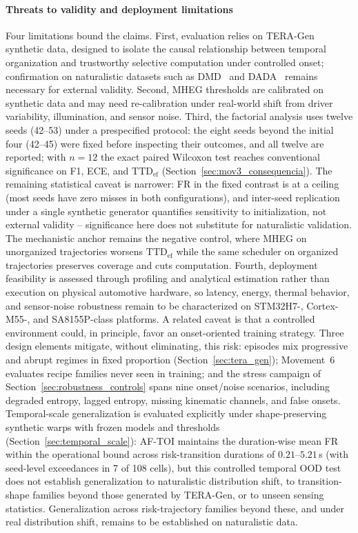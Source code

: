 \documentclass[a4paper,fleqn]{cas-dc}
\newcommand{\TERAGen}{\mbox{TERA-Gen}\xspace}
\newcommand{\MHEG}{\mbox{MHEG}\xspace}
\begin{document}
\paragraph{Threats to validity and deployment limitations}
\label{sec:limitations}
Four limitations bound the claims. First, evaluation relies on \TERAGen
synthetic data, designed to isolate the causal relationship between temporal
organization and trustworthy selective computation under controlled onset;
confirmation on naturalistic datasets such as DMD~\cite{ortega2020dmd} and
DADA~\cite{fang2022dada} remains necessary for external validity. Second, \MHEG
thresholds are calibrated on synthetic data and may need re-calibration under
real-world shift from driver variability, illumination, and sensor noise.
{\color{\revcolor}Third, the factorial analysis uses twelve seeds (42--53)
under a prespecified protocol: the eight seeds beyond the initial four
(42--45) were fixed before inspecting their outcomes, and all twelve
are reported; with $n=12$ the exact paired
Wilcoxon test reaches conventional significance on F1, ECE, and
$\mathrm{TTD}_{\mathrm{ef}}$ (Section~\ref{sec:mov3_consequencia}). The
remaining statistical caveat is narrower: FR in the fixed contrast is at a
ceiling (most seeds have zero misses in both configurations), and inter-seed
replication under a single synthetic generator quantifies sensitivity to
initialization, not external validity -- significance here does not substitute
for naturalistic validation. The mechanistic anchor remains the negative
control, where \MHEG on unorganized trajectories worsens
$\mathrm{TTD}_{\mathrm{ef}}$ while the same scheduler on organized
trajectories preserves coverage and cuts computation.} Fourth, deployment feasibility is assessed through profiling and
analytical estimation rather than execution on physical automotive hardware, so
latency, energy, thermal behavior, and sensor-noise robustness remain to be
characterized on STM32H7-, Cortex-M55-, and SA8155P-class platforms.
{\color{\revcolor}A related caveat is that a controlled environment could, in
principle, favor an onset-oriented training strategy. Three design elements
mitigate, without eliminating, this risk: episodes mix progressive and abrupt
regimes in fixed proportion (Section~\ref{sec:tera_gen}); Movement~6 evaluates
recipe families never seen in training; and the stress campaign of
Section~\ref{sec:robustness_controls} spans nine onset/noise scenarios,
including degraded entropy, lagged entropy, missing kinematic channels, and
false onsets. Temporal-scale generalization is evaluated explicitly under
shape-preserving synthetic warps with frozen models and thresholds
(Section~\ref{sec:temporal_scale}): \mbox{AF-TOI} maintains the
duration-wise mean FR within the operational bound across risk-transition
durations of $0.21$--$5.21$\,s (with seed-level exceedances in 7 of 108
cells), but this controlled temporal OOD test does not establish
generalization to naturalistic distribution shift, to transition-shape
families beyond those generated by \TERAGen, or to unseen sensing
statistics. Generalization across risk-trajectory families beyond these, and
under real distribution shift, remains to be established on naturalistic
data.}
\end{document}
